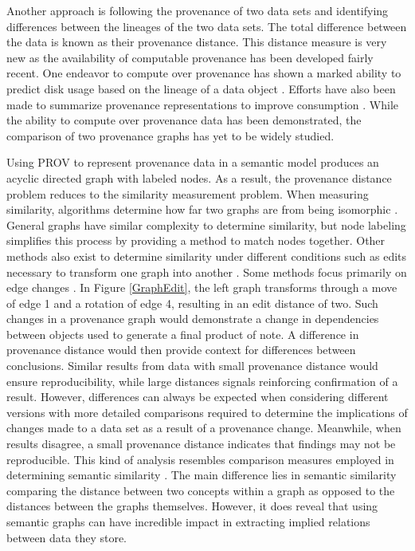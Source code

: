 Another approach is following the provenance of two data sets and identifying  differences between the lineages of the two data sets.
The total difference between the data is known as their provenance distance.
This distance measure is very new as the availability of computable provenance has been developed fairly recent.
One endeavor to compute over provenance has shown a marked ability to predict disk usage based on the lineage of a data object \cite{dai2014provenance}.
Efforts have also been made to summarize provenance representations to improve consumption \cite{Ainy:2015:ASD:2806416.2806429}.
While the ability to compute over provenance data has been demonstrated, the comparison of two provenance graphs has yet to be widely studied.

Using PROV to represent provenance data in a semantic model produces an acyclic directed graph with labeled nodes.
As a result, the provenance distance problem reduces to the similarity measurement problem.
When measuring similarity, algorithms determine how far two graphs are from being isomorphic \cite{Cao2013}.
General graphs have similar complexity to determine similarity, but node labeling simplifies this process by providing a method to match nodes together.
Other methods also exist to determine similarity under different conditions such as edits necessary to transform one graph into another  \cite{Gao2010}.
Some methods focus primarily on edge changes \cite{Goddard:1996:DGU:246962.246972}.
In Figure \ref{GraphEdit}, the left graph transforms through a move of edge 1 and a rotation of edge 4, resulting in an edit distance of two.
Such changes in a provenance graph would demonstrate a change in dependencies between objects used to generate a final product of note.
A difference in provenance distance would then provide context for differences between conclusions.
Similar results from data with small provenance distance would ensure reproducibility, while large distances signals reinforcing confirmation of a result.
However, differences can always be expected when considering different versions with more detailed comparisons required to determine the implications of changes made to a data set as a result of a provenance change.
Meanwhile, when results disagree, a small provenance distance indicates that findings may not be reproducible.
This kind of analysis resembles comparison measures employed in determining semantic similarity \cite{Hliaoutakis06informationretrieval}.
The main difference lies in semantic similarity comparing the distance between two concepts within a graph as opposed to the distances between the graphs themselves.
However, it does reveal that using semantic graphs can have incredible impact in extracting implied relations between data they store.

